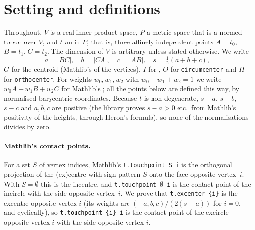 \documentclass[11pt]{article}
\theoremstyle{definition}
\theoremstyle{remark}
\newcommand{\lean}[1]{\texttt{#1}}
\begin{document}
\section{Setting and definitions}\label{sec:defs}
Throughout, $V$ is a real inner product space, $P$ a metric space that is a normed torsor over $V$,
and $t$ an  in $P$, that is, three affinely independent points
$A=t_0$, $B=t_1$, $C=t_2$. The dimension of $V$ is arbitrary unless stated otherwise. We write
\[
a=|BC|,\quad b=|CA|,\quad c=|AB|,\quad s=\tfrac12(a+b+c),
\]
$G$ for the centroid (Mathlib's  of the vertices), $I$ for
, $O$ for \lean{circumcenter} and $H$ for \lean{orthocenter}. For
weights $w_0,w_1,w_2$ with $w_0+w_1+w_2=1$ we write $w_0A+w_1B+w_2C$ for Mathlib's
; all the points below are defined this way, by normalised
barycentric coordinates. Because $t$ is non-degenerate, $s-a$, $s-b$, $s-c$ and $a,b,c$ are positive
(the library proves $s-a>0$ etc.\ from Mathlib's positivity of the heights, through Heron's
formula), so none of the normalisations divides by zero.

\paragraph{Mathlib's contact points.} For a set $S$ of vertex indices, Mathlib's
\lean{t.touchpoint S i} is the orthogonal projection of the (ex)centre with sign pattern $S$ onto the
face opposite vertex~$i$. With $S=\emptyset$ this is the incentre, and \lean{t.touchpoint \(\emptyset\) i}
is the contact point of the incircle with the side opposite vertex~$i$. We prove that
\lean{t.excenter \{i\}} is the excentre opposite vertex $i$ (its weights are
$(-a,b,c)/(2(s-a))$ for $i=0$, and cyclically), so \lean{t.touchpoint \{i\} i} is the contact point of
the excircle opposite vertex $i$ with the side opposite vertex $i$.
\end{document}
